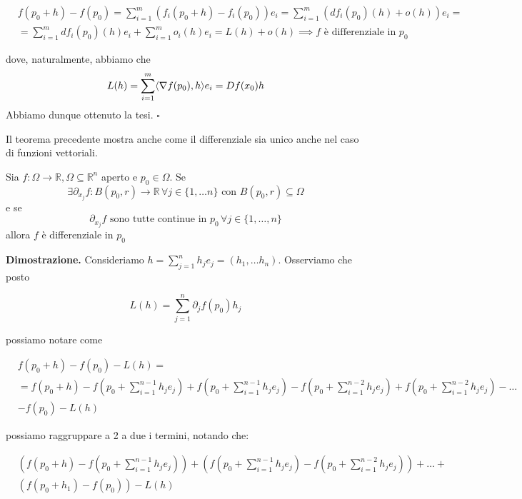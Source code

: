 \[\begin{aligned}
&f(p_0 + h) - f(p_0) = \sum_{i=1}^m (f_i(p_0 + h) - f_i(p_0))e_i = \sum_{i=1}^m (df_i(p_0)(h) + o(h))e_i = \\
&= \sum_{i=1}^m df_i(p_0)(h)e_i + \sum_{i=1}^m o_i(h)e_i = L(h) + o(h) \implies f \text{ è differenziale in } p_0
\end{aligned}\]

dove, naturalmente, abbiamo che
$$
L(h) = \sum_{i=1}^m \langle \nabla{f(p_0)}, h \rangle e_i = Df(x_0)h
$$
Abbiamo dunque ottenuto la tesi.
\hfill $\square$

\begin{cor}
Il teorema precedente mostra anche come il differenziale sia unico anche nel caso di funzioni vettoriali.
\end{cor}

\vspace{0.5cm}
\begin{theorem}[\textcolor{blue}{del differenziale totale}]
Sia $f: \Omega \to \mathbb{R}, \Omega \subseteq \mathbb{R}^n$ aperto e $p_0 \in \Omega$. Se $$\exists \partial_{x_j} f: B(p_0, r) \to \mathbb{R} \, \forall j \in \{1, \ldots n\} \text{ con } B(p_0, r) \subseteq \Omega$$ e se 
$$
\partial_{x_j} f \text{ sono tutte continue in } p_0 \, \forall j \in \{1, \ldots, n \}$$ allora $f$ è differenziale in $p_0$
\end{theorem}

\noindent \textbf{Dimostrazione. }
Consideriamo $h=\sum\limits_{j=1}^n h_j e_j = (h_1, \ldots h_n)$. Osserviamo che posto

$$L(h) = \sum_{j=1}^n \partial_j f(p_0)h_j$$

possiamo notare come

\[\begin{aligned}
&f(p_0 + h) - f(p_0) - L(h) = \\
&= f(p_0 + h) - f \left( p_0 + \sum_{i=1}^{n-1} h_j e_j \right) + f \left( p_0 + \sum_{i=1}^{n-1} h_j e_j \right) - f \left( p_0 + \sum_{i=1}^{n-2} h_j e_j \right) + f \left( p_0 + \sum_{i=1}^{n-2} h_j e_j \right) - \ldots \\ 
&- f(p_0) - L(h)
\end{aligned}\]

possiamo raggruppare a 2 a due i termini, notando che:

\[\begin{aligned}
&\left( f(p_0 + h) - f(p_0 + \sum_{i=1}^{n-1} h_j e_j) \right) + \left( f(p_0 + \sum_{i=1}^{n-1} h_j e_j) - f(p_0 + \sum_{i=1}^{n-2} h_j e_j) \right) + \ldots + \\
&\left( f(p_0 + h_1) - f(p_0) \right) - L(h)
\end{aligned}\]

